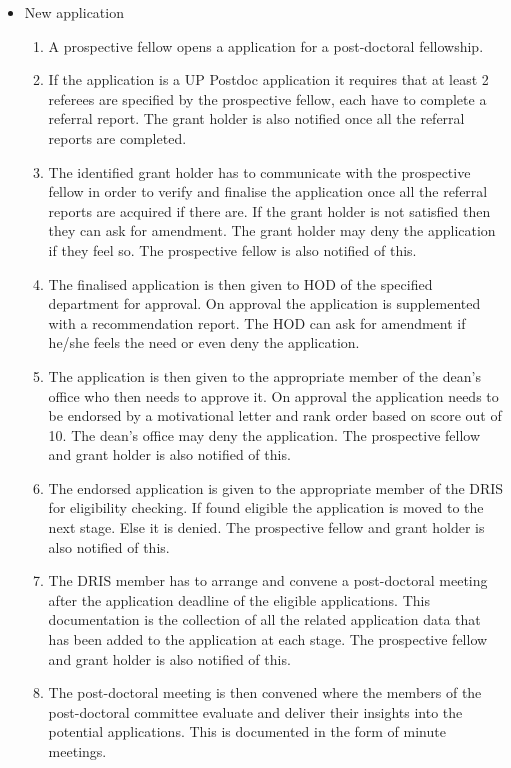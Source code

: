 \documentclass[12pt]{article}
\begin{document}
\begin{itemize}
	\item New application
		\begin{enumerate}
			\item A prospective fellow opens a application for a post-doctoral fellowship.
			\item If the application is a UP Postdoc application it requires that at least 2 referees are specified by the prospective fellow, each have to complete a referral report. The grant holder is also notified once all the referral reports are completed. 
			\item The identified grant holder has to communicate with the prospective fellow in order to verify and finalise the application once all the referral reports are acquired if there are. If the grant holder is not satisfied then they can ask for amendment. The grant holder may deny the application if they feel so. The prospective fellow is also notified of this. 
			\item The finalised application is then given to HOD of the specified department for approval. On approval the application is supplemented with a recommendation report. The HOD can ask for amendment if he/she feels the need or even deny the application.
			\item The application is then given to the appropriate member of the dean's office who then needs to approve it. On approval the application needs to be endorsed by a motivational letter and rank order based on score out of 10. The dean's office may deny the application. The prospective fellow and grant holder is also notified of this. 
			\item The endorsed application is given to the appropriate member of the DRIS for eligibility checking. If found eligible the application is moved to the next stage. Else it is denied. The prospective fellow and grant holder is also notified of this. 
			\item The DRIS member has to arrange and convene a post-doctoral meeting after the application deadline of the eligible applications. This documentation is the collection of all the related application data that has been added to the application at each stage. The prospective fellow and grant holder is also notified of this. 
			\item The post-doctoral meeting is then convened where the members of the post-doctoral committee evaluate and deliver their insights into the potential applications. This is documented in the form of minute meetings. 

\end{enumerate}
\end{itemize}
\end{document}
